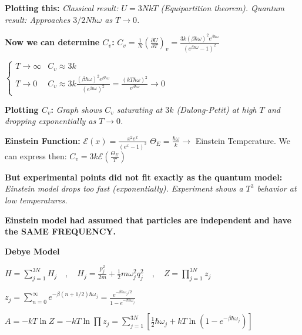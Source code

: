 \documentclass[12pt,a4paper]{report}
\newcommand{\esp}{\vspace{0.5cm}}
\begin{document}
	\esp
	
	\textbf{Plotting this:}
	\textit{Classical result: $U = 3NkT$ (Equipartition theorem). Quantum result: Approaches $3/2 N\hbar\omega$ as $T \to 0$.}
	
	\esp
	
	\textbf{Now we can determine $C_v$:}
	$C_v = \frac{1}{N} \left( \frac{\partial U}{\partial T} \right)_v = \frac{3k (\beta \hbar \omega)^2 e^{\beta \hbar \omega}}{(e^{\beta \hbar \omega} - 1)^2}$
	
	\esp
	
	$\begin{cases} T \to \infty & C_v \approx 3k \\ T \to 0 & C_v \approx 3k \frac{(\beta \hbar \omega)^2 e^{\beta \hbar \omega}}{(e^{\beta \hbar \omega})^2} = \frac{(kT \hbar \omega)^2}{e^{\beta \hbar \omega}} \to 0 \end{cases}$
	
	\esp
	
	\textbf{Plotting $C_v$:}
	\textit{Graph shows $C_v$ saturating at $3k$ (Dulong-Petit) at high $T$ and dropping exponentially as $T \to 0$.}
	
	\esp
	
	\textbf{Einstein Function:}
	$\mathcal{E}(x) = \frac{x^2 e^x}{(e^x - 1)^2}$
	$\Theta_E = \frac{\hbar \omega}{k} \to$ Einstein Temperature.
	We can express then: $C_v = 3k \mathcal{E} \left( \frac{\Theta_E}{T} \right)$
	
	\esp
	
	\textbf{But experimental points did not fit exactly as the quantum model:}
	\textit{Einstein model drops too fast (exponentially). Experiment shows a $T^3$ behavior at low temperatures.}
	
	\esp
	
	\textbf{Einstein model had assumed that particles are independent and have the SAME FREQUENCY.}
	
	\esp
	
	\textbf{Debye Model}
	
	\esp
	
	$H = \sum_{j=1}^{3N} H_j \quad , \quad H_j = \frac{p_j^2}{2m} + \frac{1}{2}m\omega_j^2 q_j^2 \quad , \quad Z = \prod_{j=1}^{3N} z_j$
	
	\esp
	
	$z_j = \sum_{n=0}^{\infty} e^{-\beta (n + 1/2) \hbar \omega_j} = \frac{e^{-\beta \hbar \omega_j / 2}}{1 - e^{-\beta \hbar \omega_j}}$
	
	\esp
	
	$A = -kT \ln Z = -kT \ln \prod z_j = \sum_{j=1}^{3N} \left[ \frac{1}{2}\hbar\omega_j + kT \ln(1 - e^{-\beta\hbar\omega_j}) \right]$
	
\end{document}
